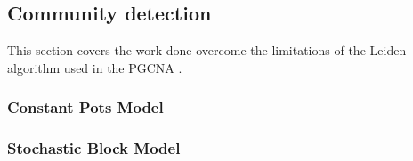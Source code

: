 \subsection{Community detection}

This section covers the work done overcome the limitations of the Leiden algorithm used in the PGCNA \cite{Care2019-ij}.

\subsubsection{Constant Pots Model}

\subsubsection{Stochastic Block Model}